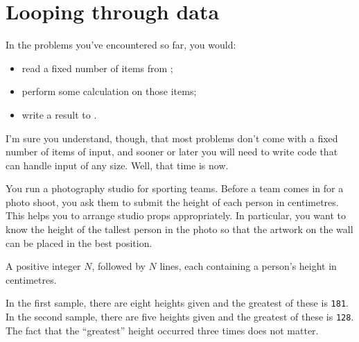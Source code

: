 
\chapter{Looping through data}

In the problems you've encountered so far, you would:
\begin{itemize}
  \item read a fixed number of items from \IN;
  \item perform some calculation on those items;
  \item write a result to \OUT.
\end{itemize}

I'm sure you understand, though, that most problems don't come with a fixed number of
items of input, and sooner or later you will need to write code that can handle input of
any size. Well, that time is now.




\clearpage


\Question You run a photography studio for sporting teams. Before a team comes in for a
photo shoot, you ask them to submit the height of each person in centimetres. This helps
you to arrange studio props appropriately. In particular, you want to know the height of
the tallest person in the photo so that the artwork on the wall can be placed in the best
position.

\Input A positive integer $N$, followed by $N$ lines, each containing a person's height in
centimetres.

\Sample

             {}

\Explanation In the first sample, there are eight heights given and the greatest of these
is \texttt{181}. In the second sample, there are five heights given and the greatest of
these is \texttt{128}. The fact that the ``greatest'' height occurred three times does not
matter.

